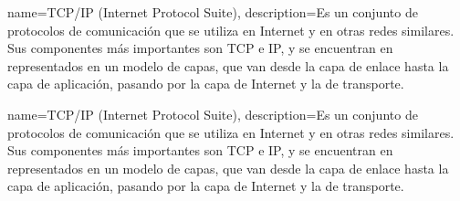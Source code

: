 {name=TCP/IP (Internet Protocol Suite),
 description={Es un conjunto de protocolos de comunicación que se utiliza en Internet y en otras redes similares. Sus componentes más importantes son TCP e IP, y se encuentran en representados en un modelo de capas, que van desde la capa de enlace hasta la capa de aplicación, pasando por la capa de Internet y la de transporte.}
 }
 
{name=TCP/IP (Internet Protocol Suite),
 description={Es un conjunto de protocolos de comunicación que se utiliza en Internet y en otras redes similares. Sus componentes más importantes son TCP e IP, y se encuentran en representados en un modelo de capas, que van desde la capa de enlace hasta la capa de aplicación, pasando por la capa de Internet y la de transporte.}
 }
 
 
 

